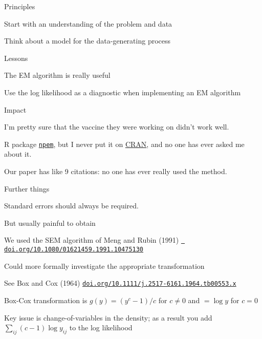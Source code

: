 \documentclass[aspectratio=169,12pt,t]{beamer}
\begin{document}
\begin{frame}{Principles}

  \bbi
\item Start with an understanding of the problem and data
\item Think about a model for the data-generating process
  \ei
\end{frame}



\begin{frame}{Lessons}

  \bbi
\item The EM algorithm is really useful
\item Use the log likelihood as a diagnostic when implementing an EM
  algorithm
  \ei
\end{frame}




\begin{frame}{Impact}

  \bbi
\item I'm pretty sure that the vaccine they were working on didn't
  work well.
\item R package \href{https://github.com/kbroman/npem}{\tt npem}, but
  I never put it on \href{https://cran.r-project.org}{CRAN}, and no
  one has ever asked me about it.
\item Our paper has like 9 citations: no one has ever really used the
  method.
  \ei

\end{frame}


\begin{frame}{Further things}

  \bbi

\item Standard errors should always be required.
  \bi
\item But usually painful to obtain
\item We used the SEM algorithm of Meng and Rubin (1991)
  \href{https://doi.org/10.1080/01621459.1991.10475130}{\tt
    doi.org/10.1080/01621459.1991.10475130}
  \ei

\item Could more formally investigate the appropriate transformation
  \bi
\item See Box and Cox (1964) \href{https://doi.org/10.1111/j.2517-6161.1964.tb00553.x}{
  \tt doi.org/10.1111/j.2517-6161.1964.tb00553.x}
\item Box-Cox transformation is $g(y) = (y^c-1)/c$ for $c \ne 0$ and
  $= \log y$ for $c=0$
\item Key issue is change-of-variables in the density; as a result you
  add $\sum_{ij} (c-1) \log y_{ij}$ to the log likelihood
    \ei
    \ei
\end{frame}
\end{document}
